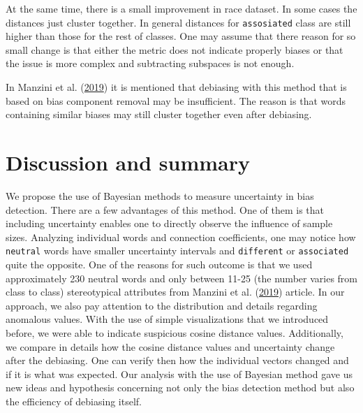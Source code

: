 \documentclass[12pt,]{book}
\begin{document}
At the same time, there is a small improvement in race dataset. In some
cases the distances just cluster together. In general distances for
\texttt{assosiated} class are still higher than those for the rest of
classes. One may assume that there reason for so small change is that
either the metric does not indicate properly biases or that the issue is
more complex and subtracting subspaces is not enough.

In Manzini et al.
(\protect\hyperlink{ref-Manzini2019blackToCriminal}{2019}) it is
mentioned that debiasing with this method that is based on bias
component removal may be insufficient. The reason is that words
containing similar biases may still cluster together even after
debiasing.

\chapter{Discussion and summary}\label{discussion-and-summary}

We propose the use of Bayesian methods to measure uncertainty in bias
detection. There are a few advantages of this method. One of them is
that including uncertainty enables one to directly observe the influence
of sample sizes. Analyzing individual words and connection coefficients,
one may notice how \texttt{neutral} words have smaller uncertainty
intervals and \texttt{different} or \texttt{associated} quite the
opposite. One of the reasons for such outcome is that we used
approximately 230 neutral words and only between 11-25 (the number
varies from class to class) stereotypical attributes from Manzini et al.
(\protect\hyperlink{ref-Manzini2019blackToCriminal}{2019}) article. In
our approach, we also pay attention to the distribution and details
regarding anomalous values. With the use of simple visualizations that
we introduced before, we were able to indicate suspicious cosine
distance values. Additionally, we compare in details how the cosine
distance values and uncertainty change after the debiasing. One can
verify then how the individual vectors changed and if it is what was
expected. Our analysis with the use of Bayesian method gave us new ideas
and hypothesis concerning not only the bias detection method but also
the efficiency of debiasing itself.
\end{document}
